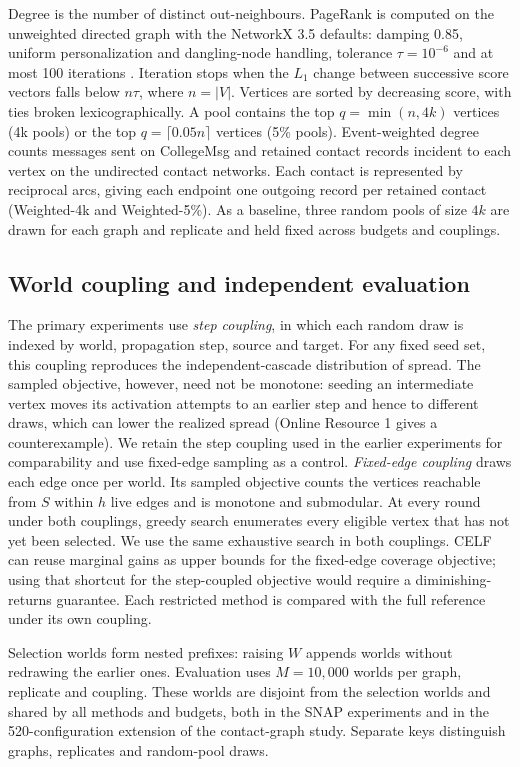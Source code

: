 \documentclass[smallextended]{svjour3}
\begin{document}
Degree is the number of distinct out-neighbours. PageRank is computed on the unweighted directed graph with the NetworkX 3.5 defaults: damping 0.85, uniform personalization and dangling-node handling, tolerance $\tau=10^{-6}$ and at most 100 iterations \cite{networkxpr}. Iteration stops when the $L_1$ change between successive score vectors falls below $n\tau$, where $n=|V|$. Vertices are sorted by decreasing score, with ties broken lexicographically. A pool contains the top $q=\min(n,4k)$ vertices (4k pools) or the top $q=\lceil 0.05n\rceil$ vertices (5\% pools). Event-weighted degree counts messages sent on CollegeMsg and retained contact records incident to each vertex on the undirected contact networks. Each contact is represented by reciprocal arcs, giving each endpoint one outgoing record per retained contact (Weighted-4k and Weighted-5\%). As a baseline, three random pools of size $4k$ are drawn for each graph and replicate and held fixed across budgets and couplings.

\subsection{World coupling and independent evaluation}\label{sec:coupling}
The primary experiments use \emph{step coupling}, in which each random draw is indexed by world, propagation step, source and target. For any fixed seed set, this coupling reproduces the independent-cascade distribution of spread. The sampled objective, however, need not be monotone: seeding an intermediate vertex moves its activation attempts to an earlier step and hence to different draws, which can lower the realized spread (Online Resource 1 gives a counterexample). We retain the step coupling used in the earlier experiments for comparability and use fixed-edge sampling as a control. \emph{Fixed-edge coupling} draws each edge once per world. Its sampled objective counts the vertices reachable from $S$ within $h$ live edges and is monotone and submodular. At every round under both couplings, greedy search enumerates every eligible vertex that has not yet been selected. We use the same exhaustive search in both couplings. CELF can reuse marginal gains as upper bounds for the fixed-edge coverage objective; using that shortcut for the step-coupled objective would require a diminishing-returns guarantee. Each restricted method is compared with the full reference under its own coupling.

Selection worlds form nested prefixes: raising $W$ appends worlds without redrawing the earlier ones. Evaluation uses $M=10{,}000$ worlds per graph, replicate and coupling. These worlds are disjoint from the selection worlds and shared by all methods and budgets, both in the SNAP experiments and in the 520-configuration extension of the contact-graph study. Separate keys distinguish graphs, replicates and random-pool draws.
\end{document}

